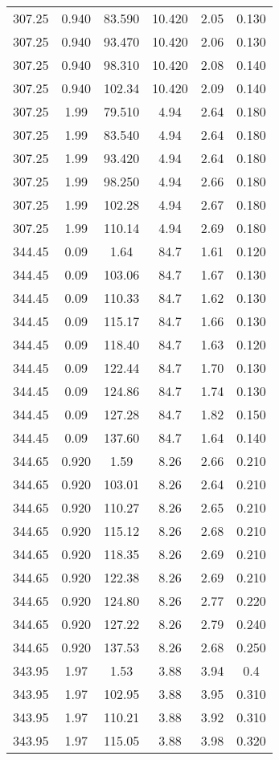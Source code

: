 \begin{longtable}{||c|c|c|c|c|c||}
307.25	&0.940	&83.590	&10.420	&2.05	&0.130\\
307.25	&0.940	&93.470	&10.420	&2.06	&0.130\\
307.25	&0.940	&98.310	&10.420	&2.08	&0.140\\
307.25	&0.940	&102.34	&10.420	&2.09	&0.140\\
307.25	&1.99	&79.510	&4.94	&2.64	&0.180\\
307.25	&1.99	&83.540	&4.94	&2.64	&0.180\\
307.25	&1.99	&93.420	&4.94	&2.64	&0.180\\
307.25	&1.99	&98.250	&4.94	&2.66	&0.180\\
307.25	&1.99	&102.28	&4.94	&2.67	&0.180\\
307.25	&1.99	&110.14	&4.94	&2.69	&0.180\\
344.45	&0.09	&1.64	&84.7	&1.61	&0.120\\
344.45	&0.09	&103.06	&84.7	&1.67	&0.130\\
344.45	&0.09	&110.33	&84.7	&1.62	&0.130\\
344.45	&0.09	&115.17	&84.7	&1.66	&0.130\\
344.45	&0.09	&118.40	&84.7	&1.63	&0.120\\
344.45	&0.09	&122.44	&84.7	&1.70	&0.130\\
344.45	&0.09	&124.86	&84.7	&1.74	&0.130\\
344.45	&0.09	&127.28	&84.7	&1.82	&0.150\\
344.45	&0.09	&137.60	&84.7	&1.64	&0.140\\
344.65	&0.920	&1.59	&8.26	&2.66	&0.210\\
344.65	&0.920	&103.01	&8.26	&2.64	&0.210\\
344.65	&0.920	&110.27	&8.26	&2.65	&0.210\\
344.65	&0.920	&115.12	&8.26	&2.68	&0.210\\
344.65	&0.920	&118.35	&8.26	&2.69	&0.210\\
344.65	&0.920	&122.38	&8.26	&2.69	&0.210\\
344.65	&0.920	&124.80	&8.26	&2.77	&0.220\\
344.65	&0.920	&127.22	&8.26	&2.79	&0.240\\
344.65	&0.920	&137.53	&8.26	&2.68	&0.250\\
343.95	&1.97	&1.53	&3.88	&3.94	&0.4\\
343.95	&1.97	&102.95	&3.88	&3.95	&0.310\\
343.95	&1.97	&110.21	&3.88	&3.92	&0.310\\
343.95	&1.97	&115.05	&3.88	&3.98	&0.320\\

\end{longtable}
